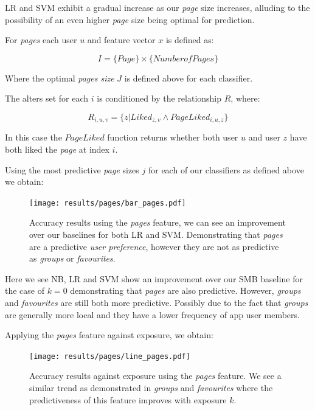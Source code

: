 LR and SVM exhibit a gradual increase as our \emph{page} size increases, alluding to the possibility of an even higher \emph{page}
size being optimal for prediction.

For \emph{pages} each user $u$ and feature vector $x$ is defined as:

\[ I = \{Page\} \times \{Number of Pages\} \]

Where the optimal \emph{pages size} $J$ is defined above for each classifier.

The alters set for each $i$ is conditioned by the relationship $R$, where:

\[ R_{i,u,v} = \{z | Liked_{z,v} \wedge PageLiked_{i,u,z}\} \]

In this case the $PageLiked$ function returns whether both user $u$ and user $z$ have both liked the \emph{page} at index $i$.

Using the most predictive \emph{page} sizes $j$ for each of our classifiers as defined above we obtain:

\begin{figure}[h]
	\begin{center}
		\texttt{[image: results/pages/bar\_pages.pdf]}
		\caption{Accuracy results using the \emph{pages} feature, we can see an improvement over our baselines for both LR and SVM. 
				 Demonstrating that \emph{pages} are a predictive \emph{user preference}, however they are not as predictive as 
				 \emph{groups} or \emph{favourites}.}
	\end{center}
\end{figure}

Here we see NB, LR and SVM show an improvement over our SMB baseline for the case of $k = 0$ demonstrating that \emph{pages} are also predictive.
However, \emph{groups} and \emph{favourites} are still both more predictive. Possibly due to the fact that \emph{groups} are generally more 
local and they have a lower frequency of app user members.

\clearpage

Applying the \emph{pages} feature against exposure, we obtain:

\begin{figure}[h]
	\begin{center}
		\texttt{[image: results/pages/line\_pages.pdf]}
		\caption{Accuracy results against exposure using the \emph{pages} feature. We see a similar trend as demonstrated in \emph{groups}
				 and \emph{favourites} where the predictiveness of this feature improves with exposure $k$.}
	\end{center}
\end{figure}

